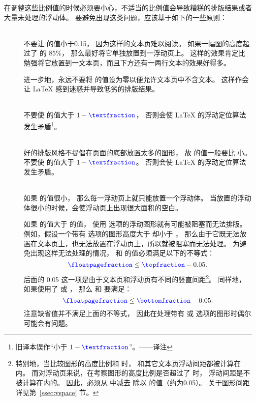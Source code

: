 在调整这些比例值的时候必须要小心，不适当的比例值会导致糟糕的排版结果或者大量未处理的浮动体。
要避免出现这类问题，应该基于如下的一些原则：
\begin{description}
	\item [] \mbox{} \\
	不要让  的值小于0.15，
	因为这样的文本页难以阅读。
	如果一幅图的高度超过了  的 $85\percent$，
	那么最好将它单独放置到一浮动页上。
	这样的效果肯定比勉强将它放置到一文本页，而且下方还有一两行文本的效果好得多。
	
	进一步地，永远不要将  的值设为零以便允许文本页中不含文本。
	这样作会让 \LaTeX{} 感到迷惑并导致低劣的排版结果。
	
	\item [] \mbox{} \\
	不要使  的值大于 $1-\text{\cmd{textfraction}}$，
	否则会使 \LaTeX{} 的浮动定位算法发生矛盾\footnote{
		旧译本误作“小于 $1-\text{\cmd{textfraction}}$”。——译注}。
	
	\item [] \mbox{} \\
	好的排版风格不提倡在页面的底部放置太多的图形，
	故  的值一般要比  小。
	不要使  的值大于 $1-\text{\cmd{textfraction}}$。
	否则会使 \LaTeX{} 的浮动定位算法发生矛盾。
	
	\item [] \mbox{} \\
	如果  的值很小，
	那么每一浮动页上就只能放置一个浮动体。
	当放置的浮动体很小的时候，会使浮动页上出现很大面积的空白。
	
	如果  的值大于  的值，
	使用 \opt{[tp]} 选项的浮动图形就有可能被阻塞而无法排版。
	例如，假设一个带有 \opt{[tp]} 选项的图形高度大于  却小于 ，
	那么由于它既无法放置在文本页上，也无法放置在浮动页上，所以就被阻塞而无法处理。
	为避免出现这样无法处理的情况，
	 和  的值必须满足以下的不等式：
	\[
	\text{\cmd{floatpagefraction}} \leq \text{\cmd{topfraction}} - 0.05.
	\]
	后面的 0.05 这一项是由于文本页和浮动页有不同的竖直间距\footnote{
        特别地，当比较图形的高度比例和  时，
		 和其它文本页浮动间距都被计算在内。
		而对浮动页来说，在考察图形的高度比例是否超过了  时，
		浮动间距是不被计算在内的。
		因此，必须从  中减去  除以  的值（约为0.05）。
        关于图形间距详见第~\ref{ssec:vspace} 节。}。
	同样地，如果使用了 \opt{[bp]} 或 \opt{[hbp]}，
	那么  和  要满足：
	\[
	\text{\cmd{floatpagefraction}} \leq \text{\cmd{bottomfraction}} - 0.05.
	\]
	注意缺省值并不满足上面的不等式，
	因此在处理带有 \opt{[bp]} 或 \opt{[hbp]} 选项的图形时偶尔可能会有问题。
\end{description}

